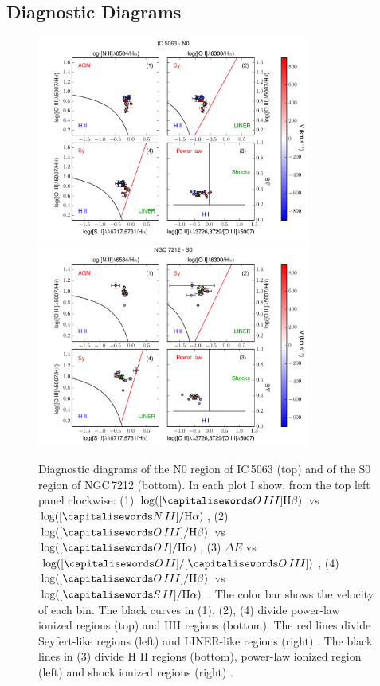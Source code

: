 \documentclass[../main.tex]{subfiles}
\begin{document}
\subsection{Diagnostic Diagrams}
\label{sec:diag}

\begin{figure} 
\centering
\includegraphics[width=0.8\textwidth]{PhD_thesis/images/paper1/IC5063_n0_diag.pdf}\\
\includegraphics[width=0.8\textwidth]{PhD_thesis/images/paper1/NGC7212_s0_diag.pdf}\\
\caption[]{Diagnostic diagrams of the N0 region of IC\,5063 (top) and of the S0 region of NGC\,7212 (bottom).  In each plot I show, from the top left panel clockwise: (1) $\log([\ion{O}{III}] \Hb)$ vs $\log([\ion{N}{II}]/ \Ha)$, (2) $\log([\ion{O}{III}]/ \Hb)$ vs $\log([\ion{O}{I}]/ \Ha)$, (3) $\Delta E$ vs $\log([\ion{O}{II}]/[\ion{O}{III}])$, (4) $\log([\ion{O}{III}]/ \Hb)$ vs $\log([\ion{S}{II}]/ \Ha)$ \citep{Baldwin81, Veilleux87}. The color bar shows the velocity of each bin. The black curves in (1), (2), (4) divide power-law ionized regions (top) and HII regions (bottom). The red lines divide Seyfert-like regions (left) and LINER-like regions (right) \citep{Kewley06}. The black lines in (3) divide H II regions (bottom), power-law ionized region (left) and shock ionized regions (right) \citep{Baldwin81}.  }
\label{fig:diag_es}
\end{figure}
\end{document}
